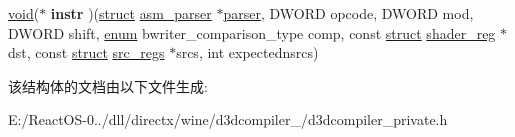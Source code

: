 \begin{DoxyCompactItemize}
\item 
\mbox{\label{structasmparser__backend_acc263dbaed79bc479469b24a58dcae83}} 
\hyperlink{interfacevoid}{void}($\ast$ {\bfseries instr} )(\hyperlink{interfacestruct}{struct} \hyperlink{structasm__parser}{asm\+\_\+parser} $\ast$\hyperlink{structparser}{parser}, D\+W\+O\+RD opcode, D\+W\+O\+RD mod, D\+W\+O\+RD shift, \hyperlink{interfaceenum}{enum} bwriter\+\_\+comparison\+\_\+type comp, const \hyperlink{interfacestruct}{struct} \hyperlink{structshader__reg}{shader\+\_\+reg} $\ast$dst, const \hyperlink{interfacestruct}{struct} \hyperlink{structsrc__regs}{src\+\_\+regs} $\ast$srcs, int expectednsrcs)
\end{DoxyCompactItemize}


该结构体的文档由以下文件生成\+:\begin{DoxyCompactItemize}
\item 
E\+:/\+React\+O\+S-\/0../dll/directx/wine/d3dcompiler\+\_/d3dcompiler\+\_\+private.\+h\end{DoxyCompactItemize}
